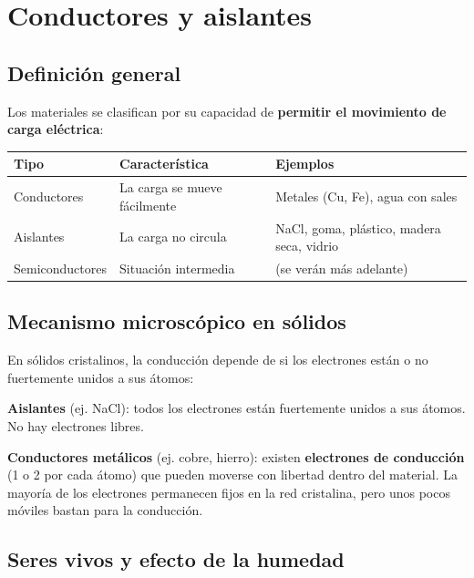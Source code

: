 \documentclass[12pt,a4paper]{article}
\begin{document}
\section{Conductores y aislantes}

\subsection{Definición general}

Los materiales se clasifican por su capacidad de \textbf{permitir el
movimiento de carga eléctrica}:

\begin{center}
\begin{tabular}{lll}
\toprule
\textbf{Tipo} & \textbf{Característica} & \textbf{Ejemplos} \\
\midrule
Conductores & La carga se mueve fácilmente & Metales (Cu, Fe),
                                           agua con sales \\
Aislantes   & La carga no circula & NaCl, goma, plástico,
                                     madera seca, vidrio \\
Semiconductores & Situación intermedia & (se verán más adelante) \\
\bottomrule
\end{tabular}
\end{center}

\subsection{Mecanismo microscópico en sólidos}

En sólidos cristalinos, la conducción depende de si los electrones están
o no fuertemente unidos a sus átomos:

\textbf{Aislantes} (ej. NaCl): todos los electrones están fuertemente
unidos a sus átomos. No hay electrones libres.

\textbf{Conductores metálicos} (ej. cobre, hierro): existen
\textbf{electrones de conducción} (1 o 2 por cada átomo) que pueden
moverse con libertad dentro del material. La mayoría de los electrones
permanecen fijos en la red cristalina, pero unos pocos móviles bastan
para la conducción.

\subsection{Seres vivos y efecto de la humedad}
\end{document}
